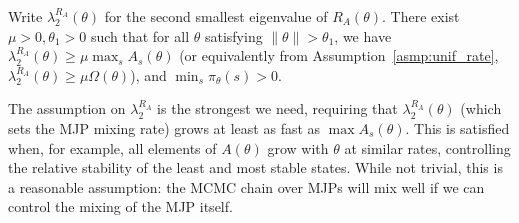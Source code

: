 \begin{assumption}
  Write $\lambda^{R_A}_2(\theta)$ for the second smallest eigenvalue of
    $R_A(\theta)$. There exist $\mu > 0, \theta_1 > 0$
    such that for all $\theta$ satisfying $ \| \theta \|> \theta_1$, 
    we have $ \lambda^{R_A}_2(\theta) \geq \mu \max_s A_s(\theta)$
    (or equivalently from Assumption~\ref{asmp:unif_rate}, 
    $ \lambda^{R_A}_2(\theta) \geq \mu \Omega(\theta)$),
    and $\min_s \pi_\theta(s) > 0$. 
  \label{asmp:cond_num}
\end{assumption} 
\noindent %
The assumption on $\lambda^{R_A}_2$ is the strongest we need, requiring that 
$\lambda^{R_A}_2(\theta)$ (which sets the MJP mixing rate) grows 
at least as fast as $\max A_s(\theta)$. 
This is satisfied when, for example, all elements of $A(\theta)$ grow 
with $\theta$ at similar rates, controlling the relative stability of 
the least and most stable states.
While not trivial, this is a reasonable assumption: the MCMC chain over MJPs 
will mix well if we can control the mixing of the MJP itself.

